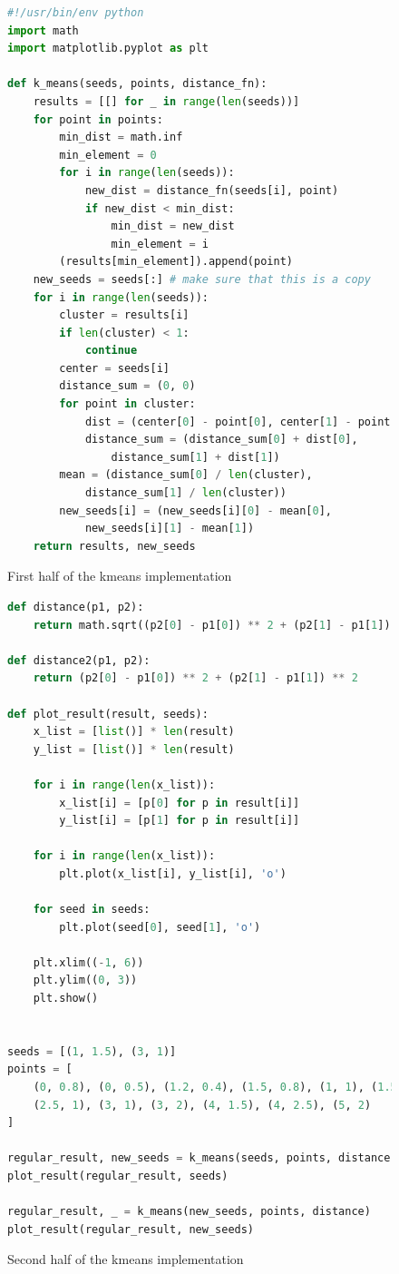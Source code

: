 \documentclass[a4paper, titlepage,12pt]{article}
\begin{document}
\begin{figure}[H]
	\begin{center}
		\begin{lstlisting}[language=Python]
#!/usr/bin/env python
import math
import matplotlib.pyplot as plt

def k_means(seeds, points, distance_fn):
    results = [[] for _ in range(len(seeds))]
    for point in points:
        min_dist = math.inf
        min_element = 0
        for i in range(len(seeds)):
            new_dist = distance_fn(seeds[i], point)
            if new_dist < min_dist:
                min_dist = new_dist
                min_element = i
        (results[min_element]).append(point)
    new_seeds = seeds[:] # make sure that this is a copy
    for i in range(len(seeds)):
        cluster = results[i]
        if len(cluster) < 1:
            continue
        center = seeds[i]
        distance_sum = (0, 0)
        for point in cluster:
            dist = (center[0] - point[0], center[1] - point[1])
            distance_sum = (distance_sum[0] + dist[0], 
				distance_sum[1] + dist[1])
        mean = (distance_sum[0] / len(cluster), 
			distance_sum[1] / len(cluster))
        new_seeds[i] = (new_seeds[i][0] - mean[0], 
			new_seeds[i][1] - mean[1])
    return results, new_seeds
		\end{lstlisting}
		\caption{First half of the kmeans implementation}
	\end{center}
\end{figure}

\begin{figure}[H]
	\begin{center}
		\begin{lstlisting}[language=Python]
def distance(p1, p2):
    return math.sqrt((p2[0] - p1[0]) ** 2 + (p2[1] - p1[1]) ** 2)

def distance2(p1, p2):
    return (p2[0] - p1[0]) ** 2 + (p2[1] - p1[1]) ** 2

def plot_result(result, seeds):
    x_list = [list()] * len(result)
    y_list = [list()] * len(result)

    for i in range(len(x_list)):
        x_list[i] = [p[0] for p in result[i]]
        y_list[i] = [p[1] for p in result[i]]

    for i in range(len(x_list)):
        plt.plot(x_list[i], y_list[i], 'o')

    for seed in seeds:
        plt.plot(seed[0], seed[1], 'o')

    plt.xlim((-1, 6))
    plt.ylim((0, 3))
    plt.show()
        

seeds = [(1, 1.5), (3, 1)]
points = [
    (0, 0.8), (0, 0.5), (1.2, 0.4), (1.5, 0.8), (1, 1), (1.5, 1), 
    (2.5, 1), (3, 1), (3, 2), (4, 1.5), (4, 2.5), (5, 2)
]

regular_result, new_seeds = k_means(seeds, points, distance)
plot_result(regular_result, seeds)

regular_result, _ = k_means(new_seeds, points, distance)
plot_result(regular_result, new_seeds)
		\end{lstlisting}
		\caption{Second half of the kmeans implementation}
	\end{center}
\end{figure}
\end{document}
